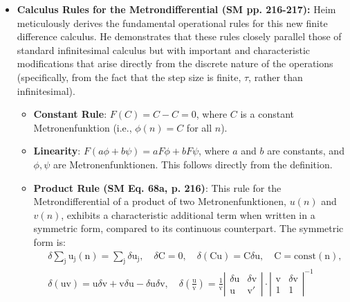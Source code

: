 \documentclass[12pt]{article}
\newcommand{\metron}{\tau}
\newcommand{\metrondifferential}{F} %
\newcommand{\metronenziffer}{n}
\begin{document}
\begin{itemize}
    \item \textbf{Calculus Rules for the Metrondifferential (SM pp. 216-217):}
    Heim meticulously derives the fundamental operational rules for this new finite difference calculus. He demonstrates that these rules closely parallel those of standard infinitesimal calculus but with important and characteristic modifications that arise directly from the discrete nature of the operations (specifically, from the fact that the step size is finite, \( \metron \), rather than infinitesimal).
    \begin{itemize}
        \item \textbf{Constant Rule}: \( \metrondifferential(C) = C - C = 0 \), where \( C \) is a constant Metronenfunktion (i.e., \( \phi(\metronenziffer) = C \) for all \( \metronenziffer \)).
        \item \textbf{Linearity}: \( \metrondifferential(a\phi + b\psi) = a\metrondifferential\phi + b\metrondifferential\psi \), where \( a \) and \( b \) are constants, and \( \phi, \psi \) are Metronenfunktionen. This follows directly from the definition.
        \item \textbf{Product Rule (SM Eq. 68a, p. 216)}: This rule for the Metrondifferential of a product of two Metronenfunktionen, \( u(\metronenziffer) \) and \( v(\metronenziffer) \), exhibits a characteristic additional term when written in a symmetric form, compared to its continuous counterpart. The symmetric form is:
        \begin{equation}
        \begin{aligned}
        & \delta\sum_\mathrm{j} \mathrm{u_j}(\mathrm{n}) = \sum_\mathrm{j} \delta\mathrm{u_j}, \quad \delta\mathrm{C} = 0, \quad \delta(\mathrm{Cu}) = \mathrm{C}\delta\mathrm{u}, \quad \mathrm{C} = \text{const}(\mathrm{n}), \\
        & \delta(\mathrm{uv}) = \mathrm{u}\delta\mathrm{v} + \mathrm{v}\delta\mathrm{u} - \delta\mathrm{u}\delta\mathrm{v}, \quad \delta\left( \frac{\mathrm{u}}{\mathrm{v}} \right) = \frac{1}{\mathrm{v}} \left| \begin{matrix} \delta\mathrm{u} & \delta\mathrm{v} \\ \mathrm{u} & \mathrm{v}' \end{matrix} \right| \cdot \left| \begin{matrix} \mathrm{v} & \delta\mathrm{v} \\ 1 & 1 \end{matrix} \right|^{-1}
        \end{aligned} \tag{68a}

\end{equation}
\end{itemize}
\end{itemize}
\end{document}

